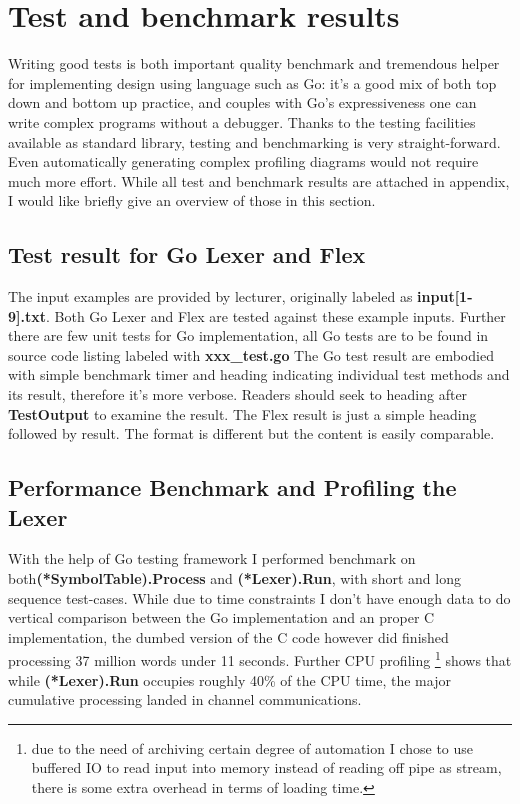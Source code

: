 \documentclass[%
 aip,
 jmp,%
 amsmath,amssymb,
 reprint,%
]{revtex4-1}
\begin{document}
\section{Test and benchmark results}
Writing good tests is both important quality benchmark and tremendous helper for implementing design using language such as Go: it's a good mix of both top down and bottom up practice, and couples with Go's expressiveness one can write complex programs without a debugger. Thanks to the testing facilities available as standard library, testing and benchmarking is very straight-forward. Even automatically generating complex profiling diagrams would not require much more effort.
While all test and benchmark results are attached in appendix, I would like briefly give an overview of those in this section.

\subsection{Test result for Go Lexer and Flex}
The input examples are provided by lecturer, originally labeled as \textbf{input[1-9].txt}. Both Go Lexer and Flex are tested against these example inputs. Further there are few unit tests for Go implementation, all Go tests are to be found in source code listing labeled with \textbf{xxx\_test.go}
The Go test result are embodied with simple benchmark timer and heading indicating individual test methods and its result, therefore it's more verbose. Readers should seek to heading after \textbf{TestOutput} to examine the result. The Flex result is just a simple heading followed by result. The format is different but the content is easily comparable.

\subsection{Performance Benchmark and Profiling the Lexer}
With the help of Go testing framework I performed benchmark on both\textbf{(*SymbolTable).Process} and \textbf{(*Lexer).Run}, with short and long sequence test-cases. While due to time constraints I don't have enough data to do vertical comparison between the Go implementation and an proper C implementation, the dumbed version of the C code however did finished processing 37 million words under 11 seconds. Further CPU profiling \footnote{due to the need of archiving certain degree of automation I chose to use buffered IO to read input into memory instead of reading off pipe as stream, there is some extra overhead in terms of loading time.} shows that while \textbf{(*Lexer).Run} occupies roughly 40\% of the CPU time, the major cumulative processing landed in channel communications. 
\end{document}
